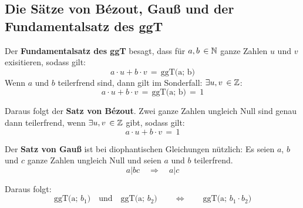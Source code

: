 \documentclass[main.tex]{subfiles}
\begin{document}
\subsection{Die Sätze von Bézout, Gauß und der Fundamentalsatz des ggT}


\begin{Definition}
	Der \textbf{Fundamentalsatz des ggT} besagt, dass für $a,b \, \in \mathbb{N}$ ganze Zahlen $u$ und $v$ exisitieren, sodass gilt:
	$$a\cdot u + b\cdot v \,=\, \text{ggT(a; b)} $$
	Wenn $a$ und $b$ teilerfrend sind, dann gilt im Sonderfall: $\exists u, v \, \in \mathbb{Z}$:
	$$a\cdot u + b\cdot v \,=\, \text{ggT(a; b)} \,=\, 1 $$
	
	Daraus folgt der \textbf{Satz von Bézout}. Zwei ganze Zahlen ungleich Null sind genau dann teilerfrend, wenn $\exists u, v \, \in \mathbb{Z}$ gibt, sodass gilt:
	$$a\cdot u + b\cdot v \,=\, 1 $$
	
	Der \textbf{Satz von Gauß} ist bei diophantischen Gleichungen nützlich: Es seien $a$, $b$ und $c$ ganze Zahlen ungleich Null und seien $a$ und $b$ teilerfrend.
	$$a | bc \quad \Rightarrow \quad a | c$$
	
	Daraus folgt:
	$$\text{ggT(a; $b_{1}$)} \quad \text{und} \quad \text{ggT(a; $b_{2}$)} \qquad \Leftrightarrow \qquad \text{ggT(a; $b_{1}\cdot b_{2}$)}$$
\end{Definition}
\end{document}
